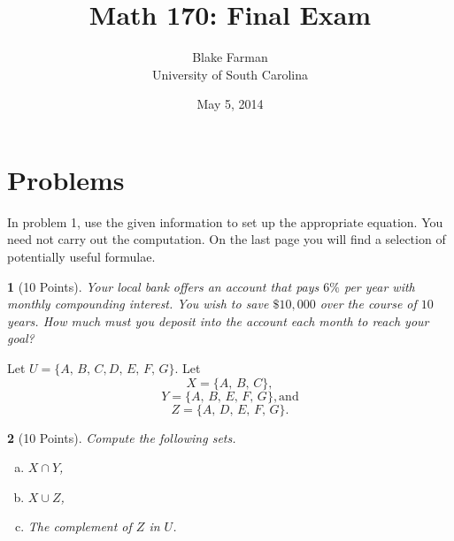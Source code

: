 \documentclass[12pt]{amsart}
\author{Blake Farman\\University of South Carolina}
\title{Math 170: Final Exam}
\date{May 5, 2014}
\begin{document}
\maketitle

\begin{center}
\end{center}

\vspace{0.2in}
\vspace{0.2in}

\theoremstyle{plain}
\newtheorem{thm}{}
\newtheorem{lem}{Lemma}
\theoremstyle{definition}
\newtheorem{defn}{Definition}

\section{Problems}

\noindent In problem 1, use the given information to set up the appropriate equation.
You need not carry out the computation.
On the last page you will find a selection of potentially useful formulae.
\begin{thm}[10 Points]\label{ex2}
  Your local bank offers an account that pays $6\%$ per year with monthly compounding interest.
  You wish to save $\$10,000$ over the course of $10$ years.
  How much must you deposit into the account each month to reach your goal?
\end{thm}

\newpage

\noindent Let $U = \{A,\, B,\, C, D,\, E,\, F,\, G\}$.
Let 
$$X = \{A,\, B,\, C\},$$
$$Y = \{A,\, B,\, E,\, F,\, G\}, \text{and}$$
$$Z = \{A,\, D,\, E,\, F,\, G\}.$$
\begin{thm}[10 Points]\label{ex4}
  Compute the following sets.
  \begin{enumerate}[(a)]
  \item
    $X \cap Y$,
    \vspace{1in}
  \item
    $X \cup Z$,
    \vspace{1in}
  \item
    The complement of $Z$ in $U$.
    \vspace{1in}
  \end{enumerate}
\end{thm}
\end{document}

